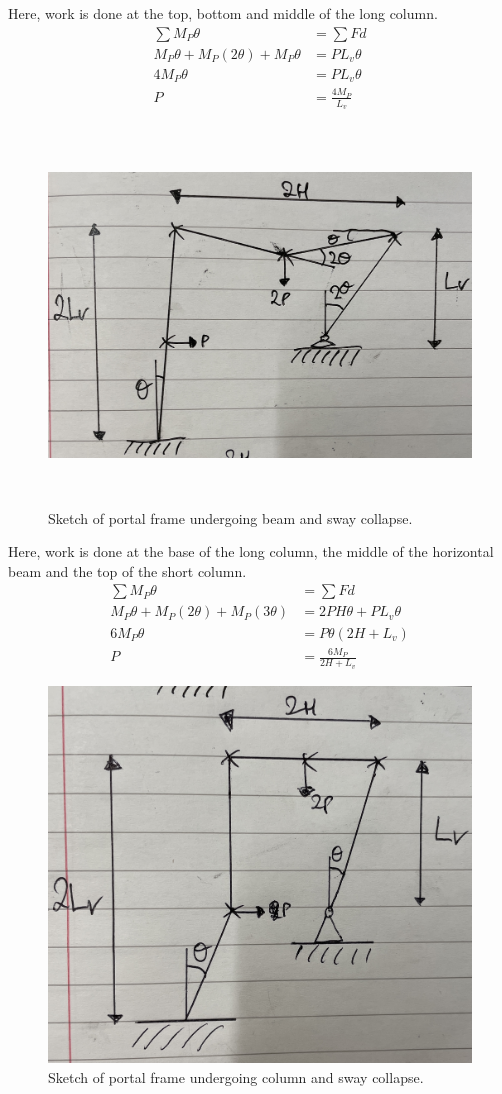 \documentclass[11pt]{article}
\numberwithin{equation}{section}
\begin{document}
Here, work is done at the top, bottom and middle of the long column.
\begin{align}
    \sum M_P \theta &= \sum Fd\\
    M_P \theta + M_P(2\theta) + M_P\theta &= PL_v \theta\\
    4M_P \theta &= PL_v\theta\\
    P &= \frac{4M_P}{L_v}
\end{align}
\begin{figure}[H]
    \centering
    \includegraphics[height = 10cm]{./img/q3i6.jpg}
    \caption{Sketch of portal frame undergoing beam and sway collapse.}
\end{figure}
Here, work is done at the base of the long column, the middle of the horizontal beam and the top of the short column. 
\begin{align}
    \sum M_P \theta &= \sum Fd\\
    M_P \theta + M_P (2\theta) + M_P (3\theta) &= 2PH\theta + PL_v\theta\\
    6M_P\theta &= P\theta \left(2H + L_v\right)\\
    P &= \frac{6M_P}{2H + L_v}
\end{align}
\begin{figure}[H]
    \centering
    \includegraphics[height = 10cm]{./img/q3i7.jpg}
    \caption{Sketch of portal frame undergoing column and sway collapse.}
\end{figure}
\end{document}
